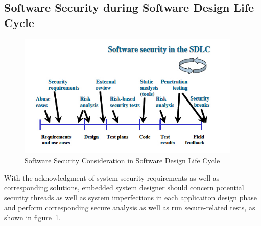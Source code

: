 \subsection{Software Security during Software Design Life Cycle}
\begin{figure}[!htb]
	\centering
	\includegraphics[width=0.95\textwidth]{sdlc.jpg}
		\caption{Software Security Consideration in Software  Design Life  Cycle \cite{embedded_secure}}
	\label{fig:sdlc}
\end{figure}
With the acknowledgment of system security requirements as well as corresponding solutions, embedded system designer should concern potential security threads as well as system imperfections in each applicaiton design phase and perform corresponding secure analysis as well as run secure-related tests, as shown in figure~\ref{fig:sdlc}.

